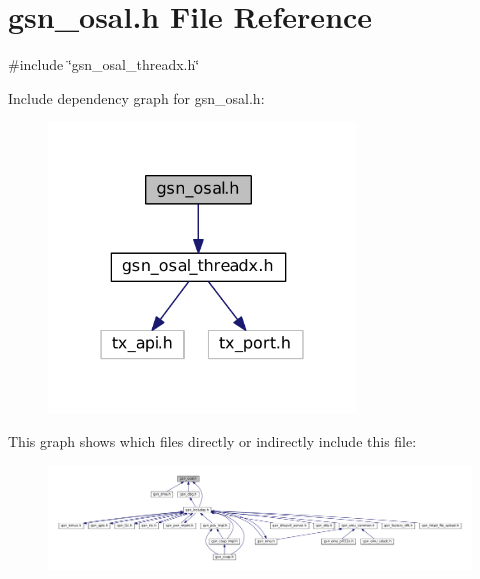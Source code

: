 \hypertarget{a00535}{
\section{gsn\_\-osal.h File Reference}
\label{a00535}
}
{\ttfamily \#include \char`\"{}gsn\_\-osal\_\-threadx.h\char`\"{}}\par
Include dependency graph for gsn\_\-osal.h:
\nopagebreak
\begin{figure}[H]
\begin{center}
\leavevmode
\includegraphics[width=231pt]{a00771}
\end{center}
\end{figure}
This graph shows which files directly or indirectly include this file:
\nopagebreak
\begin{figure}[H]
\begin{center}
\leavevmode
\includegraphics[width=400pt]{a00772}
\end{center}
\end{figure}
